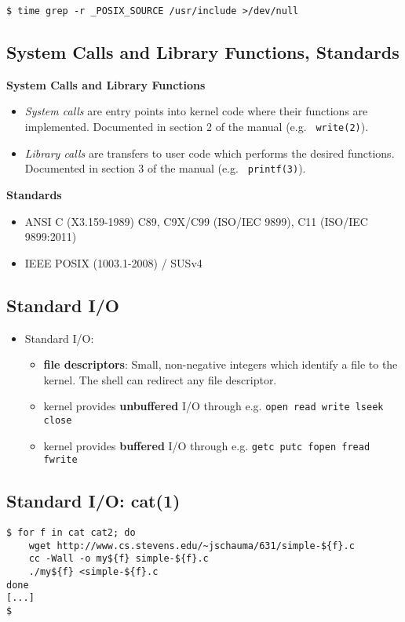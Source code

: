 \documentclass[xga]{xdvislides}
\begin{document}
\vspace*{\fill}
\begin{verbatim}
$ time grep -r _POSIX_SOURCE /usr/include >/dev/null
\end{verbatim}
\vspace*{\fill}

\subsection{System Calls and Library Functions, Standards}
{\bf System Calls and Library Functions}
\begin{itemize}
	\item {\em System calls} are entry points into kernel code where their functions
		are implemented.  Documented in section 2 of the manual (e.g. {\tt
		write(2)}).
	\item {\em Library calls} are transfers to user code which performs the desired
		functions. Documented in section 3 of the manual (e.g. {\tt
		printf(3)}).
\end{itemize}
\vspace{.5in}
{\bf Standards}
\begin{itemize}
	\item ANSI C (X3.159-1989) C89, C9X/C99 (ISO/IEC 9899), C11 (ISO/IEC 9899:2011)
	\item IEEE POSIX (1003.1-2008) / SUSv4
\end{itemize}

\subsection{Standard I/O}
\begin{itemize}
	\item	Standard I/O:
		\begin{itemize}
			\item {\bf file descriptors}: Small, non-negative
				integers which identify a file to the kernel.
				The shell can redirect any file descriptor.
			\item kernel provides {\bf unbuffered} I/O through e.g.
				{\tt open read write lseek close}
			\item kernel provides {\bf buffered} I/O through e.g.
				{\tt getc putc fopen fread fwrite}
		\end{itemize}
\end{itemize}

\subsection{Standard I/O: cat(1)}
\vspace*{\fill}
\begin{verbatim}
$ for f in cat cat2; do
    wget http://www.cs.stevens.edu/~jschauma/631/simple-${f}.c
    cc -Wall -o my${f} simple-${f}.c
    ./my${f} <simple-${f}.c
done
[...]
$
\end{verbatim}
\vspace*{\fill}
\end{document}
